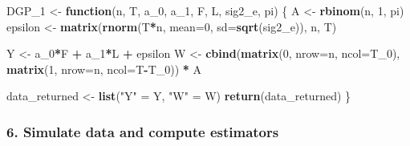 \documentclass[
]{article}
\newenvironment{Shaded}{\begin{snugshade}}{\end{snugshade}}
\newcommand{\ControlFlowTok}[1]{\textcolor[rgb]{0.13,0.29,0.53}{\textbf{#1}}}
\newcommand{\DataTypeTok}[1]{\textcolor[rgb]{0.13,0.29,0.53}{#1}}
\newcommand{\DecValTok}[1]{\textcolor[rgb]{0.00,0.00,0.81}{#1}}
\newcommand{\KeywordTok}[1]{\textcolor[rgb]{0.13,0.29,0.53}{\textbf{#1}}}
\newcommand{\NormalTok}[1]{#1}
\newcommand{\OperatorTok}[1]{\textcolor[rgb]{0.81,0.36,0.00}{\textbf{#1}}}
\newcommand{\StringTok}[1]{\textcolor[rgb]{0.31,0.60,0.02}{#1}}
\begin{document}
\begin{Shaded}
\begin{Highlighting}[]
\NormalTok{DGP_}\DecValTok{1}\NormalTok{ <-}\StringTok{ }\ControlFlowTok{function}\NormalTok{(n, T, a_}\DecValTok{0}\NormalTok{, a_}\DecValTok{1}\NormalTok{, F, L, sig2_e, pi) \{}
\NormalTok{  A <-}\StringTok{ }\KeywordTok{rbinom}\NormalTok{(n, }\DecValTok{1}\NormalTok{, pi)}
\NormalTok{  epsilon <-}\StringTok{ }\KeywordTok{matrix}\NormalTok{(}\KeywordTok{rnorm}\NormalTok{(T}\OperatorTok{*}\NormalTok{n, }\DataTypeTok{mean=}\DecValTok{0}\NormalTok{, }\DataTypeTok{sd=}\KeywordTok{sqrt}\NormalTok{(sig2_e)), n, T)}

\NormalTok{  Y <-}\StringTok{ }\NormalTok{a_}\DecValTok{0}\OperatorTok{*}\NormalTok{F }\OperatorTok{+}\StringTok{ }\NormalTok{a_}\DecValTok{1}\OperatorTok{*}\NormalTok{L }\OperatorTok{+}\StringTok{ }\NormalTok{epsilon }
\NormalTok{  W <-}\StringTok{ }\KeywordTok{cbind}\NormalTok{(}\KeywordTok{matrix}\NormalTok{(}\DecValTok{0}\NormalTok{, }\DataTypeTok{nrow=}\NormalTok{n, }\DataTypeTok{ncol=}\NormalTok{T_}\DecValTok{0}\NormalTok{), }\KeywordTok{matrix}\NormalTok{(}\DecValTok{1}\NormalTok{, }\DataTypeTok{nrow=}\NormalTok{n, }\DataTypeTok{ncol=}\NormalTok{T}\OperatorTok{-}\NormalTok{T_}\DecValTok{0}\NormalTok{)) }\OperatorTok{*}\StringTok{ }\NormalTok{A}

\NormalTok{  data_returned <-}\StringTok{ }\KeywordTok{list}\NormalTok{(}\StringTok{"Y"}\NormalTok{ =}\StringTok{ }\NormalTok{Y, }\StringTok{"W"}\NormalTok{ =}\StringTok{ }\NormalTok{W)}
  \KeywordTok{return}\NormalTok{(data_returned)}
\NormalTok{\}}
\end{Highlighting}
\end{Shaded}

\hypertarget{simulate-data-and-compute-estimators}{%
\subsubsection{6. Simulate data and compute
estimators}\label{simulate-data-and-compute-estimators}}
\end{document}

